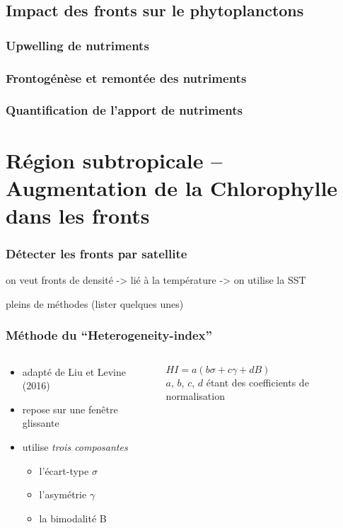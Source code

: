 \subsection{Impact des fronts sur le phytoplanctons}
\subsubsection{Upwelling de nutriments}

\begin{frame}
  \frametitle{Frontogénèse et remontée des nutriments}
  \centering
\end{frame}

\begin{frame}
  \frametitle{Quantification de l'apport de nutriments}

\end{frame}

\section{Région subtropicale -- Augmentation de la Chlorophylle dans les fronts}

\begin{frame}
  \frametitle{Détecter les fronts par satellite}
  on veut fronts de densité -> lié à la température -> on utilise la SST

  pleins de méthodes (lister quelques unes)
\end{frame}

\begin{frame}
  \frametitle{Méthode du “Heterogeneity-index”}

  \begin{columns}
    \begin{column}{0.45\textwidth}
      \begin{itemize}
        \item adapté de Liu et Levine (2016)
        \item repose sur une fenêtre glissante
        \item utilise \emph{trois composantes}
              \begin{itemize}
                \item l'écart-type \(\sigma\)
                \item l'asymétrie \(\gamma\)
                \item la bimodalité B
              \end{itemize}
      \end{itemize}
    \end{column}
    \hfill
    \begin{column}{0.45\textwidth}
      \(HI = a \left( b\sigma + c\gamma + dB \right)\)
      \\
      {\small \(a\), \(b\), \(c\), \(d\) étant des coefficients de normalisation}
    \end{column}
  \end{columns}

\end{frame}

